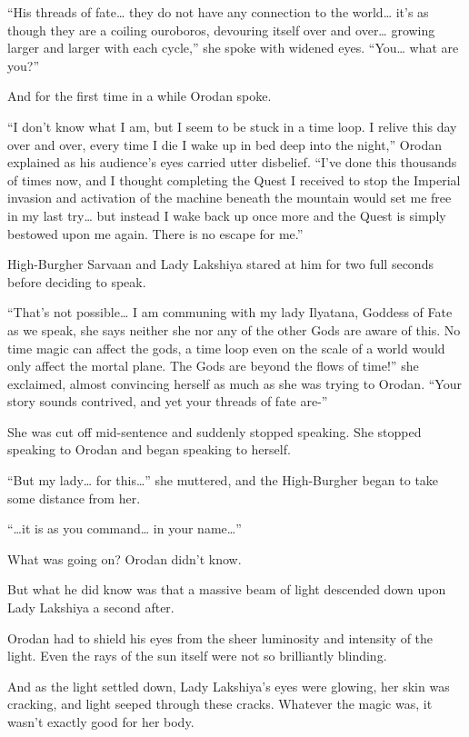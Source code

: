 \documentclass[a4paper,10pt]{book}
\begin{document}
“His threads of fate… they do not have any connection to the world… it’s as though they are a coiling ouroboros, devouring itself over and over… growing larger and larger with each cycle,” she spoke with widened eyes. “You… what are you?”\par
And for the first time in a while Orodan spoke.\par
“I don’t know what I am, but I seem to be stuck in a time loop. I relive this day over and over, every time I die I wake up in bed deep into the night,” Orodan explained as his audience’s eyes carried utter disbelief. “I’ve done this thousands of times now, and I thought completing the Quest I received to stop the Imperial invasion and activation of the machine beneath the mountain would set me free in my last try… but instead I wake back up once more and the Quest is simply bestowed upon me again. There is no escape for me.”\par
High-Burgher Sarvaan and Lady Lakshiya stared at him for two full seconds before deciding to speak.\par
“That’s not possible… I am communing with my lady Ilyatana, Goddess of Fate as we speak, she says neither she nor any of the other Gods are aware of this. No time magic can affect the gods, a time loop even on the scale of a world would only affect the mortal plane. The Gods are beyond the flows of time!” she exclaimed, almost convincing herself as much as she was trying to Orodan. “Your story sounds contrived, and yet your threads of fate are-”\par
She was cut off mid-sentence and suddenly stopped speaking. She stopped speaking to Orodan and began speaking to herself.\par
“But my lady… for this…” she muttered, and the High-Burgher began to take some distance from her.\par
“…it is as you command… in your name…”\par
What was going on? Orodan didn’t know.\par
But what he did know was that a massive beam of light descended down upon Lady Lakshiya a second after.\par
Orodan had to shield his eyes from the sheer luminosity and intensity of the light. Even the rays of the sun itself were not so brilliantly blinding.\par
And as the light settled down, Lady Lakshiya’s eyes were glowing, her skin was cracking, and light seeped through these cracks. Whatever the magic was, it wasn’t exactly good for her body.\par
\end{document}
